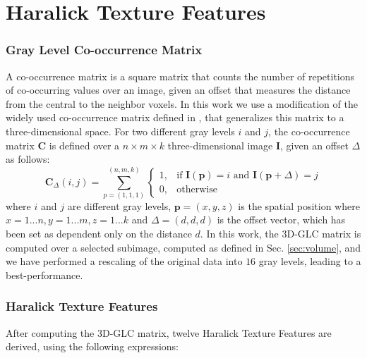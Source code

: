 \section{Haralick Texture Features}\label{sec:haralick}
\subsubsection{Gray Level Co-occurrence Matrix}
A co-occurrence matrix is a square matrix that counts the number of repetitions of co-occurring values over an image, given an offset that measures the distance from the central to the neighbor voxels. In this work we use a modification of the widely used co-occurrence matrix defined in \cite{Philips2008}, that generalizes this matrix to a three-dimensional space. For two different gray levels $i$ and $j$, the co-occurrence matrix $\mathbf{C}$ is defined over a $n \times m \times k$ three-dimensional image $\mathbf{I}$, given an offset $\Delta$ as follows: 
\begin{equation}\label{eq:cooc3D}
\mathbf{C}_{\Delta}(i,j)=\sum_{p=(1,1,1)}^{(n,m,k)}\begin{cases} 1, & \mbox{if }\mathbf{I}(\mathbf{p})=i\mbox{ and }\mathbf{I}(\mathbf{p}+\Delta)=j \\ 0, & \mbox{otherwise}\end{cases}
\end{equation}
where $i$ and $j$ are different gray levels, $\mathbf{p}=(x,y,z)$ is the spatial position where $x=1...n, y=1...m, z=1...k$ and $\Delta=(d,d,d)$ is the offset vector, which  has been set as dependent only on the distance $d$. In this work, the 3D-GLC matrix is computed over a selected subimage, computed as defined in Sec. \ref{sec:volume}, and we have performed a rescaling of the original data into $16$ gray levels, leading to a best-performance.


\subsubsection{Haralick Texture Features}
After computing the 3D-GLC matrix, twelve Haralick Texture Features \cite{Haralick73} are derived, using the following expressions:

